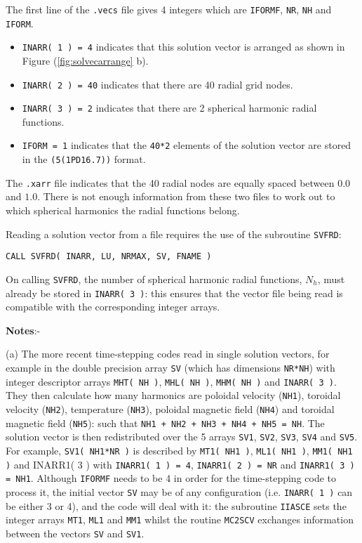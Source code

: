 The first line of the \verb+.vecs+ file gives 4 integers
which are \verb+IFORMF+, \verb+NR+, \verb+NH+ and \verb+IFORM+.
\begin{itemize}
\item \verb+INARR( 1 ) = 4+ indicates that
this solution vector is arranged as shown in
Figure (\ref{fig:solvecarrange} b).
\item \verb+INARR( 2 ) = 40+ indicates that
there are 40 radial grid nodes.
\item \verb+INARR( 3 ) = 2+ indicates that
there are 2 spherical harmonic radial functions.
\item \verb+IFORM = 1+ indicates that
the \verb+40*2+ elements of the solution vector are
stored in the \verb+(5(1PD16.7))+ format.
\end{itemize}
The \verb+.xarr+ file indicates that the 40 radial
nodes are equally spaced between $0.0$ and $1.0$.
There is not enough information from these two
files to work out to which spherical harmonics the
radial functions belong.

Reading a solution vector from a file requires the use
of the subroutine \verb+SVFRD+:
\begin{verbatim}
CALL SVFRD( INARR, LU, NRMAX, SV, FNAME )
\end{verbatim}
On calling \verb+SVFRD+, the number of spherical harmonic
radial functions, $N_h$, must already be stored in
\verb+INARR( 3 )+: this ensures that the vector file
being read is compatible with the corresponding
integer arrays. \newline

{\bf Notes}:- \newline

(a) The more recent time-stepping codes read in
single solution vectors, for example in the
double precision array \verb+SV+ (which has
dimensions \verb+NR*NH+) with integer
descriptor arrays \verb+MHT( NH )+,
                  \verb+MHL( NH )+,
                  \verb+MHM( NH )+ and
                  \verb+INARR( 3 )+.
They then calculate how many harmonics are
poloidal velocity (\verb.NH1.),
toroidal velocity (\verb.NH2.),
temperature (\verb.NH3.),
poloidal magnetic field (\verb.NH4.) and
toroidal magnetic field (\verb.NH5.): such
that \verb.NH1 + NH2 + NH3 + NH4 + NH5 = NH..
The solution vector is then redistributed
over the 5 arrays \verb+SV1+, 
\verb+SV2+, \verb+SV3+, \verb+SV4+ and \verb+SV5+.
For example,
\verb+SV1( NH1*NR )+ is described by
\verb+MT1( NH1 )+,
\verb+ML1( NH1 )+,
\verb+MM1( NH1 )+ and INARR1( 3 ) with
\verb+INARR1( 1 ) = 4+,
\verb+INARR1( 2 ) = NR+ and
\verb+INARR1( 3 ) = NH1+.
Although \verb.IFORMF. needs to be 4 in order for the
time-stepping code to process it, the initial vector
\verb+SV+ may be of any configuration
(i.e. \verb+INARR( 1 )+ can be either 3 or 4), and the
code will deal with it: the subroutine
\verb+IIASCE+ sets the integer arrays
\verb+MT1+,
\verb+ML1+ and
\verb+MM1+ whilst the routine \verb+MC2SCV+
exchanges information between the vectors
\verb+SV+ and \verb+SV1+. \newline


